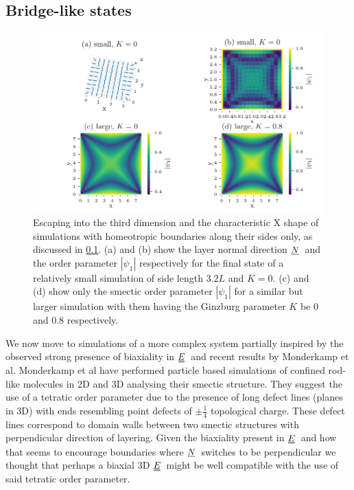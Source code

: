 \documentclass[12pt]{article}
\newcommand{\suf}[2]{\stackunder[0.5pt]{\stackunder[1pt]{\ensuremath{#1}}{\rule{\widthof{\ensuremath{#2}}*\real{0.9}}{.1ex}}}{}}
\newcommand{\duf}[2]{\stackunder[0.5pt]{\stackunder[0.8pt]{\stackunder[1pt]{\ensuremath{#1}}{\rule{\widthof{\ensuremath{#2}}*\real{0.9}}{.1ex}}}{\rule{\widthof{\ensuremath{#2}}*\real{0.9}}{.1ex}}}{}}
\newcommand{\su}[1]{\suf{#1}{#1}}
\newcommand{\du}[1]{\duf{#1}{#1}}
\newcommand{\NN}{\ensuremath{\su{N}}}
\newcommand{\EE}{\ensuremath{\du{E}}}
\begin{document}
    \subsection{Bridge-like states}\label{sec:nr_bs}
        \begin{figure}[t!]
            \begin{center}
                \includegraphics{figures/data_plots/fbox_r12_cross.pdf}
            \end{center}
            \caption{
                Escaping into the third dimension and the characteristic X shape of simulations with homeotropic boundaries along their sides only, as discussed in \cref{sec:nr_bs}.
                (a) and (b) show the layer normal direction \NN\ and the order parameter $|\psi_1|$ respectively for the final state of a relatively small simulation of side length $3.2\si{L}$ and $K=0$.
                (c) and (d) show only the smectic order parameter $|\psi_1|$ for a similar but larger simulation with them having the Ginzburg parameter $K$ be 0 and 0.8 respectively.
            }\label{fig:fbox_cross}
        \end{figure}
        We now move to simulations of a more complex system partially inspired by the observed strong presence of biaxiality in \EE\ and recent results by Monderkamp et al\cite{a.monderkampTopologicalFineStructure2022,monderkampTopologyOrientationalDefects2021}.
        Monderkamp et al have performed particle based simulations of confined rod-like molecules in 2D and 3D analysing their smectic structure.
        They suggest the use of a tetratic order parameter due to the presence of long defect lines (planes in 3D) with ends resembling point defects of $\pm\frac{1}{4}$ topological charge.
        These defect lines correspond to domain walls between two smectic structures with perpendicular direction of layering.
        Given the biaxiality present in \EE\ and how that seems to encourage boundaries where \NN\ switches to be perpendicular we thought that perhaps a biaxial 3D \EE\ might be well compatible with the use of said tetratic order parameter.
\end{document}
